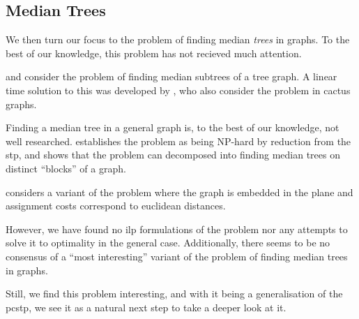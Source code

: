  \subsection{Median Trees}\label{sec:related:mtp}
 We then turn our focus to the problem of finding median \textit{trees} in graphs.
  To the best of our knowledge, this problem has not recieved much attention.

  \citet{minieka1985optimal} and \citet{george2003bi} consider the problem of finding
  median subtrees of a tree graph.
  A linear time solution to this was developed by
  \citet{kim1991locating}, who also consider the problem in cactus graphs.

  Finding a median tree in a general graph is, to the best of our knowledge, not well researched.
 \citet{aneja1992location} establishes the
  problem as being NP-hard by reduction from the \gls{stp}, and shows that the problem can
  decomposed into finding median trees on distinct ``blocks'' of a graph.

  \citet{kim1991locating} considers a variant of the problem where the graph is embedded in the plane
  and assignment costs correspond to euclidean distances.
  
  However, we have found no \gls{ilp} formulations of the problem nor any attempts to solve it to optimality
  in the general case. Additionally, there seems to be no consensus of a ``most interesting'' variant
  of the problem of finding median trees in graphs.

  Still, we find this problem interesting, and with it being a generalisation of the
  \gls{pcstp}, we see it as a natural next step to take a deeper look at it.


